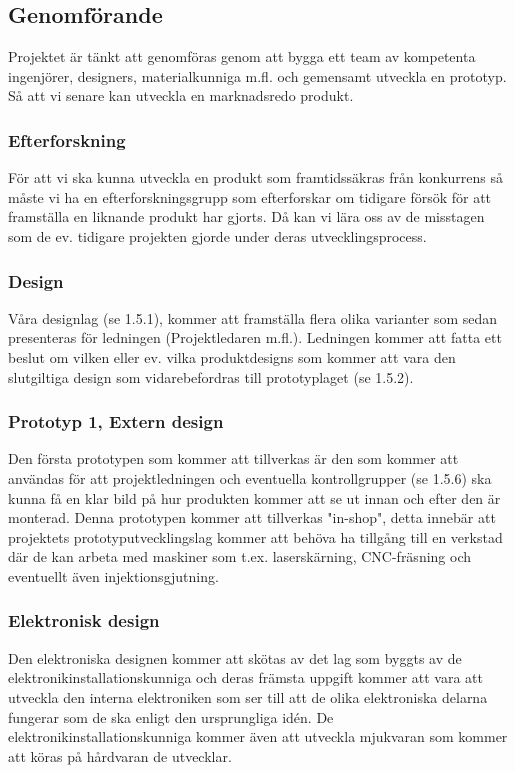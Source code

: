 \documentclass{article}
\begin{document}
	\subsection{Genomförande}
	Projektet är tänkt att genomföras genom att bygga ett team av kompetenta ingenjörer, designers, materialkunniga m.fl. och gemensamt utveckla en prototyp. Så att vi senare kan utveckla en marknadsredo produkt.
	\subsubsection{Efterforskning}
	För att vi ska kunna utveckla en produkt som framtidssäkras från konkurrens så måste vi ha en efterforskningsgrupp som efterforskar om tidigare försök för att framställa en liknande produkt har gjorts. Då kan vi lära oss av de misstagen som de ev. tidigare projekten gjorde under deras utvecklingsprocess.
	\subsubsection{Design}
	Våra designlag (se 1.5.1), kommer att framställa flera olika varianter som sedan presenteras för ledningen (Projektledaren m.fl.). Ledningen kommer att fatta ett beslut om vilken eller ev. vilka produktdesigns som kommer att vara den slutgiltiga design som vidarebefordras till prototyplaget (se 1.5.2). 
	\subsubsection{Prototyp 1, Extern design}
	Den första prototypen som kommer att tillverkas är den som kommer att användas för att projektledningen och eventuella kontrollgrupper (se 1.5.6) ska kunna få en klar bild på hur produkten kommer att se ut innan och efter den är monterad. Denna prototypen kommer att tillverkas "in-shop", detta innebär att projektets prototyputvecklingslag kommer att behöva ha tillgång till en verkstad där de kan arbeta med maskiner som t.ex. laserskärning, CNC-fräsning och eventuellt även injektionsgjutning. 
	\subsubsection{Elektronisk design}
	Den elektroniska designen kommer att skötas av det lag som byggts av de elektronikinstallationskunniga och deras främsta uppgift kommer att vara att utveckla den interna elektroniken som ser till att de olika elektroniska delarna fungerar som de ska enligt den ursprungliga idén. De elektronikinstallationskunniga kommer även att utveckla mjukvaran som kommer att köras på hårdvaran de utvecklar.
\end{document}
